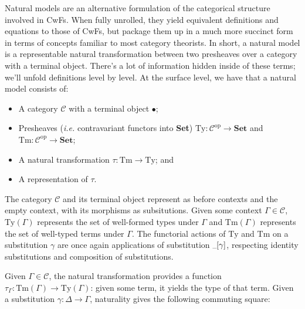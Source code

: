 \documentclass{article}
\makeatletter
\newcommand{\ie}{\textit{i.e.}\@\xspace}
\renewcommand{\_}{\textrm{\textscale{.5}{\textunderscore}}}
\newcommand{\op}[1]{#1^{\mathrm{op}}}
\newcommand{\cat}[1]{\textbf{#1}}
\newcommand{\Tm}{\mathrm{Tm}}
\newcommand{\Ty}{\mathrm{Ty}}
\theoremstyle{definition}
\theoremstyle{plain}
\makeatother
\begin{document}
Natural models are an alternative formulation of the categorical structure involved in CwFs.
When fully unrolled, they yield equivalent definitions and equations to those of CwFs,
but package them up in a much more succinct form in terms of concepts familiar to most category theorists.
In short, a natural model is a representable natural transformation between two presheaves over a category with a terminal object.
There's a lot of information hidden inside of these terms; we'll unfold definitions level by level.
At the surface level, we have that a natural model consists of:

\begin{itemize}
    \item A category $\mathcal{C}$ with a terminal object $\bullet$;
    \item Presheaves (\ie contravariant functors into \cat{Set})
    $\Ty : \op{\mathcal{C}} \to \cat{Set}$ and
    $\Tm : \op{\mathcal{C}} \to \cat{Set}$;
    \item A natural transformation $\tau : \Tm \to \Ty$; and
    \item A representation of $\tau$.
\end{itemize}

The category $\mathcal{C}$ and its terminal object represent as before contexts and the empty context,
with its morphisms as subsitutions.
Given some context $\Gamma \in \mathcal{C}$, $\Ty(\Gamma)$ represents the set of well-formed types under $\Gamma$
and $\Tm(\Gamma)$ represents the set of well-typed terms under $\Gamma$.
The functorial actions of $\Ty$ and $\Tm$ on a substitution $\gamma$ are once again applications of substitution $\_[\gamma]$, respecting identity substitutions and composition of substitutions.

Given $\Gamma \in \mathcal{C}$, the natural transformation provides a function $\tau_\Gamma : \Tm(\Gamma) \to \Ty(\Gamma)$:
given some term, it yields the type of that term.
Given a substitution $\gamma : \Delta \to \Gamma$,
naturality gives the following commuting square:

\begin{center}
\end{center}
\end{document}
